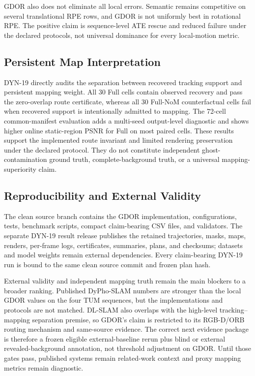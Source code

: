GDOR also does not eliminate all local errors.
Semantic remains competitive on several translational RPE rows, and GDOR is not uniformly best in rotational RPE.
The positive claim is sequence-level ATE rescue and reduced failure under the declared protocols, not universal dominance for every local-motion metric.

\subsection{Persistent Map Interpretation}

DYN-19 directly audits the separation between recovered tracking support and persistent mapping weight.
All 30 Full cells contain observed recovery and pass the zero-overlap route certificate, whereas all 30 Full-NoM counterfactual cells fail when recovered support is intentionally admitted to mapping.
The 72-cell common-manifest evaluation adds a multi-seed output-level diagnostic and shows higher online static-region PSNR for Full on most paired cells.
These results support the implemented route invariant and limited rendering preservation under the declared protocol.
They do not constitute independent ghost-contamination ground truth, complete-background truth, or a universal mapping-superiority claim.

\subsection{Reproducibility and External Validity}

The clean source branch contains the GDOR implementation, configurations, tests, benchmark scripts, compact claim-bearing CSV files, and validators.
The separate DYN-19 result release publishes the retained trajectories, masks, maps, renders, per-frame logs, certificates, summaries, plans, and checksums; datasets and model weights remain external dependencies.
Every claim-bearing DYN-19 run is bound to the same clean source commit and frozen plan hash.

External validity and independent mapping truth remain the main blockers to a broader ranking.
Published DyPho-SLAM numbers are stronger than the local GDOR values on the four TUM sequences, but the implementations and protocols are not matched.
DL-SLAM also overlaps with the high-level tracking--mapping separation premise, so GDOR's claim is restricted to its RGB-D/ORB routing mechanism and same-source evidence.
The correct next evidence package is therefore a frozen eligible external-baseline rerun plus blind or external revealed-background annotation, not threshold adjustment on GDOR.
Until those gates pass, published systems remain related-work context and proxy mapping metrics remain diagnostic.
